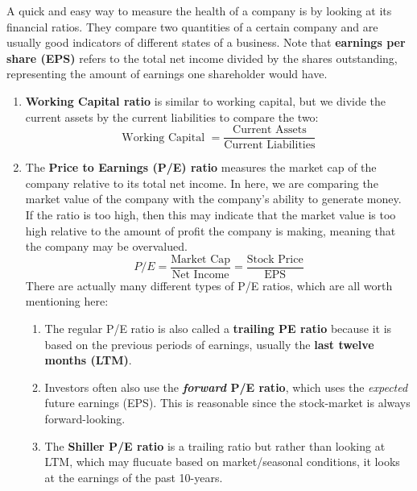 \documentclass{article}
\begin{document}
    A quick and easy way to measure the health of a company is by looking at its financial ratios. They compare two quantities of a certain company and are usually good indicators of different states of a business. Note that \textbf{earnings per share (EPS)} refers to the total net income divided by the shares outstanding, representing the amount of earnings one shareholder would have.

    \begin{enumerate}
      \item \textbf{Working Capital ratio} is similar to working capital, but we divide the current assets by the current liabilities to compare the two:
      \begin{equation}
        \text{Working Capital } = \frac{\text{Current Assets}}{\text{Current Liabilities}}
      \end{equation}

      \item The \textbf{Price to Earnings (P/E) ratio} measures the market cap of the company relative to its total net income. In here, we are comparing the market value of the company with the company's ability to generate money. If the ratio is too high, then this may indicate that the market value is too high relative to the amount of profit the company is making, meaning that the company may be overvalued.
      \begin{equation}
        P/E = \frac{\text{Market Cap}}{\text{Net Income}} = \frac{\text{Stock Price}}{\text{EPS}}
      \end{equation}
      There are actually many different types of P/E ratios, which are all worth mentioning here:
      \begin{enumerate}
        \item The regular P/E ratio is also called a \textbf{trailing PE ratio} because it is based on the previous periods of earnings, usually the \textbf{last twelve months (LTM)}.
        \item Investors often also use the \textbf{\textit{forward} P/E ratio}, which uses the \textit{expected} future earnings (EPS). This is reasonable since the stock-market is always forward-looking.
        \item The \textbf{Shiller P/E ratio} is a trailing ratio but rather than looking at LTM, which may flucuate based on market/seasonal conditions, it looks at the earnings of the past 10-years.
      \end{enumerate}


\end{enumerate}
\end{document}
